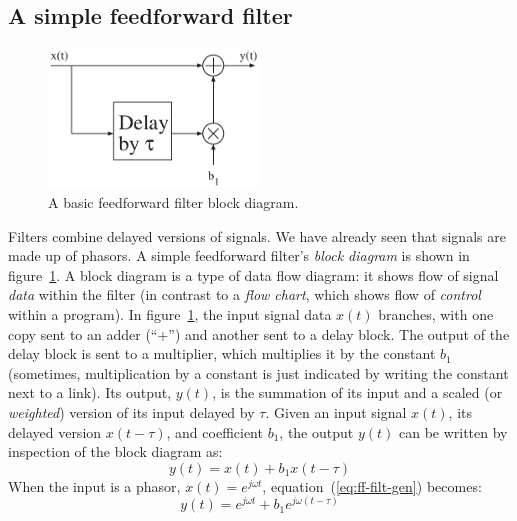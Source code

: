 \subsection{A simple feedforward filter}

\begin{figure}
\centerline{\includegraphics[width=0.5\textwidth]{ch-fir/ff-bdiag}}
\caption{A basic feedforward filter block diagram.
  \label{fig:ff-bdiag}}
\end{figure}

Filters combine delayed versions of signals. We have already seen that
signals are made up of phasors. A simple feedforward filter's
\emph{block diagram} is shown in figure~\ref{fig:ff-bdiag}.
A block diagram is a type of data flow diagram: it shows flow of
signal \emph{data} within the filter (in contrast to a \emph{flow chart}, which
shows flow of \emph{control} within a program). In
figure~\ref{fig:ff-bdiag}, the input signal data $x(t)$ branches, with
one copy sent to an adder (``+'') and another sent to a delay
block. The output of the delay block is sent to a multiplier, which
multiplies it by the constant $b_1$ (sometimes, multiplication by a
constant is just indicated by writing the constant next to a
link). 
Its output, $y(t)$, is the summation of its input and a
scaled (or \emph{weighted}) version of its input delayed by
$\tau$. Given an input signal $x(t)$, its delayed version $x(t-\tau)$,
and coefficient $b_1$, the output $y(t)$ can be written by inspection
of the block diagram as:
\begin{equation}
y(t) = x(t) + b_1 x(t-\tau) \label{eq:ff-filt-gen}
\end{equation}
When the input is a phasor, $x(t) = e^{j\omega t}$,
equation~(\ref{eq:ff-filt-gen}) becomes:
\begin{equation}
y(t)=e^{j\omega t} + b_1 e^{j\omega (t-\tau)}
\label{eq:ff-filt-ph}
\end{equation}

